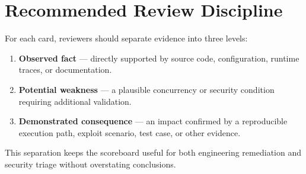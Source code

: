\documentclass[11pt]{article}
\begin{document}
\section{Recommended Review Discipline}

For each card, reviewers should separate evidence into three levels:
\begin{enumerate}
  \item \textbf{Observed fact} --- directly supported by source code, configuration, runtime traces, or documentation.
  \item \textbf{Potential weakness} --- a plausible concurrency or security condition requiring additional validation.
  \item \textbf{Demonstrated consequence} --- an impact confirmed by a reproducible execution path, exploit scenario, test case, or other evidence.
\end{enumerate}

This separation keeps the scoreboard useful for both engineering remediation and security triage without overstating conclusions.
\end{document}

